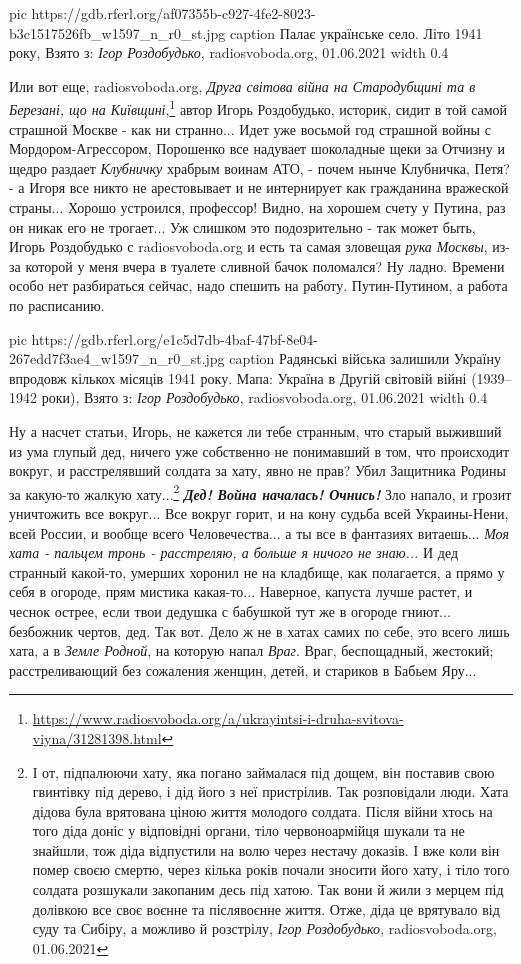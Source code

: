 \ifcmt
  pic https://gdb.rferl.org/af07355b-c927-4fe2-8023-b3c1517526fb_w1597_n_r0_st.jpg
  caption Палає українське село. Літо 1941 року, Взято з: \emph{Ігор Роздобудько}, radiosvoboda.org, 01.06.2021
  width 0.4
\fi

Или вот еще, radiosvoboda.org, \emph{Друга світова війна на Стародубщині та в
Березані, що на
Київщині},\footnote{\url{https://www.radiosvoboda.org/a/ukrayintsi-i-druha-svitova-viyna/31281398.html}}
автор Игорь Роздобудько, историк, сидит в той самой страшной Москве - как ни
странно...  Идет уже восьмой год страшной войны с Мордором-Агрессором,
Порошенко все надувает шоколадные щеки за Отчизну и щедро раздает
\emph{Клубничку} храбрым воинам АТО, - почем нынче Клубничка, Петя? - а Игоря
все никто не арестовывает и не интернирует как гражданина вражеской страны...
Хорошо устроился, профессор! Видно, на хорошем счету у Путина, раз он никак его
не трогает... Уж слишком это подозрительно - так может быть, Игорь Роздобудько
с radiosvoboda.org и есть та самая зловещая \emph{рука Москвы}, из-за которой у
меня вчера в туалете сливной бачок поломался? Ну ладно. Времени особо нет
разбираться сейчас, надо спешить на работу. Путин-Путином, а работа по
расписанию.

\ifcmt
  pic https://gdb.rferl.org/e1c5d7db-4baf-47bf-8e04-267edd7f3ae4_w1597_n_r0_st.jpg
  caption Радянські війська залишили Україну впродовж кількох місяців 1941 року. Мапа: Україна в Другій світовій війні (1939–1942 роки), Взято з: \emph{Ігор Роздобудько}, radiosvoboda.org, 01.06.2021
  width 0.4
\fi

Ну а насчет статьи, Игорь, не кажется ли тебе странным, что старый выживший из
ума глупый дед, ничего уже собственно не понимавший в том, что происходит
вокруг, и расстрелявший солдата за хату, явно не прав? Убил Защитника Родины за
какую-то жалкую хату...\footnote{
І от, підпалюючи хату, яка погано займалася під дощем, він поставив свою
гвинтівку під дерево, і дід його з неї пристрілив. Так розповідали люди. Хата
дідова була врятована ціною життя молодого солдата. Після війни хтось на того
діда доніс у відповідні органи, тіло червоноармійця шукали та не знайшли, тож
діда відпустили на волю через нестачу доказів. І вже коли він помер своєю
смертю, через кілька років почали зносити його хату, і тіло того солдата
розшукали закопаним десь під хатою. Так вони й жили з мерцем під долівкою все
своє воєнне та післявоєнне життя. Отже, діда це врятувало від суду та Сибіру, а
можливо й розстрілу, \emph{Ігор Роздобудько}, radiosvoboda.org, 01.06.2021} \textbf{\emph{Дед! Война
началась! Очнись!}} Зло напало, и грозит уничтожить все вокруг... Все вокруг
горит, и на кону судьба всей Украины-Нени, всей России, и вообще всего
Человечества...  а ты все в фантазиях витаешь... \emph{Моя хата - пальцем тронь
- расстреляю, а больше я ничого не знаю...} И дед странный какой-то, умерших
хоронил не на кладбище, как полагается, а прямо у себя в огороде, прям мистика
какая-то... Наверное, капуста лучше растет, и чеснок острее, если твои дедушка
с бабушкой тут же в огороде гниют...  безбожник чертов, дед. Так вот. Дело ж не
в хатах самих по себе, это всего лишь хата, а в \emph{Земле Родной}, на которую
напал \emph{Враг}. Враг, беспощадный, жестокий; расстреливающий без сожаления
женщин, детей, и стариков в Бабьем Яру...

